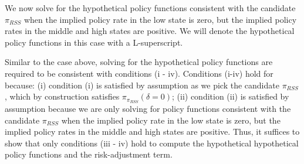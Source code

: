 \documentclass[11pt]{article}
\begin{document}
\begin{singlespace}
		We now solve for the hypothetical policy functions consistent with the candidate $\pi_{RSS}$ when the implied policy rate in the low state is zero, but the implied policy rates in the middle and high states are positive. We will denote the hypothetical policy functions in this case with a L-superscript. 
		
		Similar to the case above, solving for the hypothetical policy functions are required to be consistent with conditions (i - iv). Conditions (i-iv) hold for because: (i) condition (i) is satisfied by assumption as we pick the candidate $\pi_{RSS}$, which by construction satisfies $\pi_{\pi_{RSS}}(\delta=0)$; (ii) condition (ii) is satisfied by assumption because we are only solving for policy functions consistent with the candidate $\pi_{RSS}$ when the implied policy rate in the low state is zero, but the implied policy rates in the middle and high states are positive. Thus, it suffices to show that only conditions (iii - iv) hold to compute the hypothetical hypothetical policy functions and the risk-adjustment term. 
		

\end{singlespace}
\end{document}
